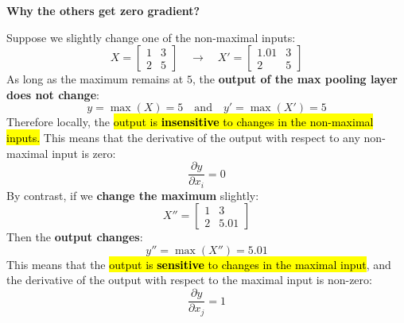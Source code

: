 \begin{flushleft}
    \textcolor{Green3}{ \textbf{Why the others get zero gradient?}}
\end{flushleft}
Suppose we slightly change one of the non-maximal inputs:
\begin{equation*}
    X =
    \begin{bmatrix}
        1 & 3\\
        2 & 5
    \end{bmatrix}
    \quad \longrightarrow \quad
    X'=
    \begin{bmatrix}
        1.01 & 3\\
        2 & 5
    \end{bmatrix}
\end{equation*}
As long as the maximum remains at \(5\), the \textbf{output of the max pooling layer does not change}:
\begin{equation*}
    y = \max(X) = 5 \quad \text{and} \quad
    y' = \max(X') = 5
\end{equation*}
Therefore locally, the \hl{output is \textbf{insensitive} to changes in the non-maximal inputs.} This means that the derivative of the output with respect to any non-maximal input is zero:
\begin{equation*}
    \frac{\partial y}{\partial x_i} = 0
\end{equation*}
By contrast, if we \textbf{change the maximum} slightly:
\begin{equation*}
    X'' =
    \begin{bmatrix}
        1 & 3\\
        2 & 5.01
    \end{bmatrix}
\end{equation*}
Then the \textbf{output changes}:
\begin{equation*}
    y'' = \max(X'') = 5.01
\end{equation*}
This means that the \hl{output is \textbf{sensitive} to changes in the maximal input}, and the derivative of the output with respect to the maximal input is non-zero:
\begin{equation*}
    \frac{\partial y}{\partial x_j} = 1
\end{equation*}

